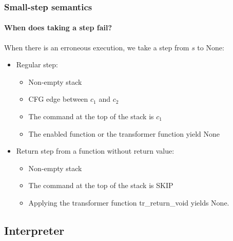 \begin{frame}
\frametitle{Small-step semantics}
\framesubtitle{When does taking a step fail?}

When there is an erroneous execution, we take a step from $s$ to None:
\begin{itemize}
\item{Regular step:}
\begin{itemize}
\item{Non-empty stack}
\item{CFG edge between $c_1$ and $c_2$}
\item{The command at the top of the stack is $c_1$}
\item{The enabled function or the transformer function yield None}
\end{itemize}
\item{Return step from a function without return value:}
\begin{itemize}
\item{Non-empty stack}
\item{The command at the top of the stack is SKIP}
\item{Applying the transformer function tr\_return\_void yields None.}
\end{itemize}
\end{itemize}


\end{frame}


%
%
%
%
%
%
%
%
%
%


\subsection{Interpreter}


